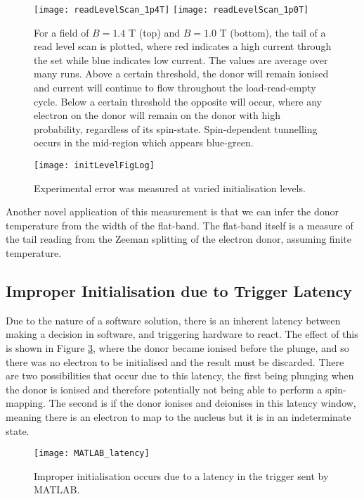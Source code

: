 	\begin{figure}[htbp!]
		\flushleft
		\texttt{[image: readLevelScan\_1p4T]}
		\texttt{[image: readLevelScan\_1p0T]}
		\caption[Read level scan for two magnetic biases]{For a field of $B = 1.4$ T (top) and $B = 1.0$ T (bottom), the tail of a read level scan is plotted, where red indicates a high current through the \gls{set} while blue indicates low current. The values are average over many runs. 
		Above a certain threshold, the donor will remain ionised and current will continue to flow throughout the load-read-empty cycle. Below a certain threshold the opposite will occur, where any electron on the donor will remain on the donor with high probability, regardless of its spin-state.
		Spin-dependent tunnelling occurs in the mid-region which appears blue-green. 
		}
		\label{fig::readLevel}
	\end{figure}
	
	\begin{figure}[htbp!]
		\centering
		\texttt{[image: initLevelFigLog]}
		\caption{Experimental error was measured at varied initialisation levels.}
		\label{fig::initLevel}
	\end{figure}
	
	Another novel application of this measurement is that we can infer the donor temperature from the width of the flat-band. The flat-band itself is a measure of the tail reading from the Zeeman splitting of the electron donor, assuming finite temperature.

\subsection{Improper Initialisation due to Trigger Latency}
	\label{sec::latency}
	Due to the nature of a software solution, there is an inherent latency between making a decision in software, and triggering hardware to react. The effect of this is shown in Figure \ref{fig::latency}, where the donor became ionised before the plunge, and so there was no electron to be initialised and the result must be discarded. There are two possibilities that occur due to this latency, the first being plunging when the donor is ionised and therefore potentially not being able to perform a spin-mapping. The second is if the donor ionises and deionises in this latency window, meaning there is an electron to map to the nucleus but it is in an indeterminate state.
	
	\begin{figure}[htbp!]
		\centering
		\texttt{[image: MATLAB\_latency]}
		\caption{Improper initialisation occurs due to a latency in the trigger sent by MATLAB.}
		\label{fig::latency}
	\end{figure}
	
